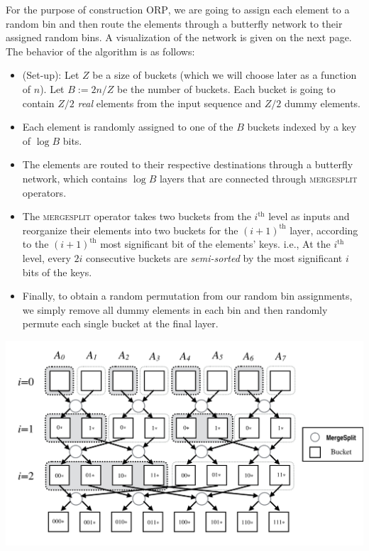 For the purpose of construction \textsc{ORP}, we are going to assign each element to a random bin and then route the elements through a butterfly network to their assigned random bins. A visualization of the network is given on the next page. The behavior of the algorithm is as follows:
\begin{itemize}
    \item (Set-up): Let $Z$ be a size of buckets (which we will choose later as a function of $n$). Let $B := 2n/Z$ be the number of buckets. Each bucket is going to contain $Z/2$ \emph{real} elements from the input sequence and $Z/2$ dummy elements.

    \item Each element is randomly  assigned to one of the $B$ buckets indexed by a key of  $\log B$ bits.

    \item The elements are routed to their respective destinations through a butterfly network, which contains $\log B$ layers that are connected through \textsc{mergesplit} operators.

    \item The \textsc{mergesplit} operator takes two buckets from the $i^{\text{th}}$ level as inputs and reorganize their elements into two buckets for  the $(i+1)^{\text{th}}$ layer, according to the $(i+1)^{\text{th}}$ most significant bit of the elements' keys. i.e., At the $i^{\text{th}}$ level, every $2i$ consecutive buckets are \emph{semi-sorted} by the most significant $i$ bits of the keys.

    \item Finally, to obtain a random permutation from our random bin assignments, we  simply remove  all  dummy  elements in each bin and then randomly permute each single bucket at the final layer. 
\end{itemize}

\includegraphics[scale=0.45]{fig2.png}

